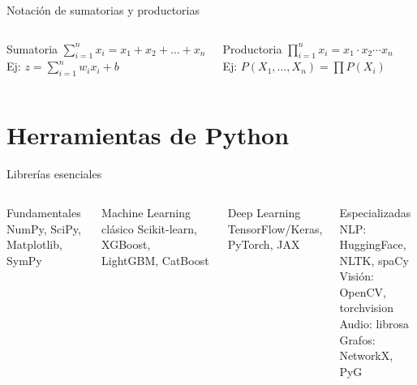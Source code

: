 \documentclass[aspectratio=169, 10pt, xcolor=table]{beamer}
\begin{document}
\begin{frame}{Notación de sumatorias y productorias}
    \begin{columns}[t]
        \begin{exampleblock}{Sumatoria}
            $\displaystyle \sum_{i=1}^{n} x_i = x_1 + x_2 + \dots + x_n$ \\
            Ej: $z = \sum_{i=1}^{n} w_i x_i + b$
        \end{exampleblock}
        \begin{exampleblock}{Productoria}
            $\displaystyle \prod_{i=1}^{n} x_i = x_1 \cdot x_2 \cdots x_n$ \\
            Ej: $P(X_1,\dots,X_n) = \prod P(X_i)$
        \end{exampleblock}
    \end{columns}
\end{frame}

\section{Herramientas de Python}

\begin{frame}{Librerías esenciales}
    \begin{columns}[t]
        \begin{block}{Fundamentales}
            NumPy, SciPy, Matplotlib, SymPy
        \end{block}
        \begin{block}{Machine Learning clásico}
            Scikit-learn, XGBoost, LightGBM, CatBoost
        \end{block}
        \begin{block}{Deep Learning}
            TensorFlow/Keras, PyTorch, JAX
        \end{block}
        \begin{block}{Especializadas}
            NLP: HuggingFace, NLTK, spaCy \\
            Visión: OpenCV, torchvision \\
            Audio: librosa \\
            Grafos: NetworkX, PyG
        \end{block}
    \end{columns}
\end{frame}
\end{document}
